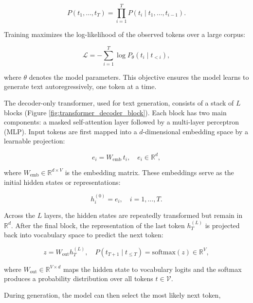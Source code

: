 \begin{equation*}
P(t_1, \ldots, t_T) = \prod_{i=1}^{T} P(t_i \mid t_1, \ldots, t_{i-1}).
\end{equation*}

Training maximizes the log-likelihood of the observed tokens over a large corpus:

\begin{equation*}
\mathcal{L} = - \sum_{i=1}^{T} \log P_\theta(t_i \mid t_{<i}),
\end{equation*}

where $\theta$ denotes the model parameters. This objective ensures the model learns to generate text autoregressively, one token at a time.

The decoder-only transformer, used for text generation, consists of a stack of $L$ blocks (Figure \ref{fig:transformer_decoder_block}). Each block has two main components: a masked self-attention layer followed by a multi-layer perceptron (MLP). Input tokens are first mapped into a $d$-dimensional embedding space by a learnable projection:

\begin{equation*}
e_i = W_{\text{emb}} \, t_i, \quad e_i \in \mathbb{R}^d,
\end{equation*}

where $W_{\text{emb}} \in \mathbb{R}^{d \times V}$ is the embedding matrix. These embeddings serve as the initial hidden states or representations:

\begin{equation*}
h_i^{(0)} = e_i, \quad i=1,\ldots,T.
\end{equation*}

Across the $L$ layers, the hidden states are repeatedly transformed but remain in $\mathbb{R}^d$. After the final block, the representation of the last token $h_T^{(L)}$ is projected back into vocabulary space to predict the next token:

\begin{equation*}
    z = W_{\text{out}} h_T^{(L)}, \quad P(t_{T+1} \mid t_{\leq T}) = \text{softmax}(z) \in \mathbb{R}^V,
\end{equation*}

where $W_{\text{out}} \in \mathbb{R}^{V \times d}$ maps the hidden state to vocabulary logits and the softmax produces a probability distribution over all tokens $t \in \mathcal{V}$.

During generation, the model can then select the most likely next token,

